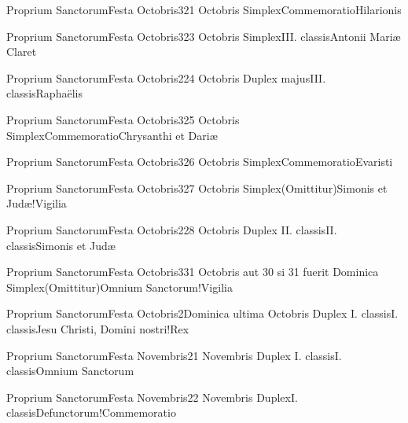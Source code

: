 \documentclass[psalterium-feriale.tex]{subfiles}
\begin{document}
	{Proprium Sanctorum}{Festa Octobris}{3}{21 Octobris}
	{Simplex}{Commemoratio}{Hilarionis}
	{}
	{}
\COPOaRubric

	{Proprium Sanctorum}{Festa Octobris}{3}{23 Octobris}
	{Simplex}{III. classis}{Antonii Mariæ Claret}
	{}
	{}
\COPOaRubric

	{Proprium Sanctorum}{Festa Octobris}{2}{24 Octobris}
	{Duplex majus}{III. classis}{Raphaëlis}
	{}
	{}
\psalmodiapropria

	{Proprium Sanctorum}{Festa Octobris}{3}{25 Octobris}
	{Simplex}{Commemoratio}{Chrysanthi et Dariæ}
	{}
	{}
\PMEXaRubric

	{Proprium Sanctorum}{Festa Octobris}{3}{26 Octobris}
	{Simplex}{Commemoratio}{Evaristi}
	{}
	{}
\UMEXaRubric

	{Proprium Sanctorum}{Festa Octobris}{3}{27 Octobris}
	{Simplex}{(Omittitur)}{Simonis et Judæ!Vigilia}
	{}
	{}
\feriaRubric

	{Proprium Sanctorum}{Festa Octobris}{2}{28 Octobris}
	{Duplex II. classis}{II. classis}{Simonis et Judæ}
	{}
	{}
\psalmodiapropria

	{Proprium Sanctorum}{Festa Octobris}{3}{31 Octobris aut 30 si 31 fuerit Dominica}
	{Simplex}{(Omittitur)}{Omnium Sanctorum!Vigilia}
	{}
	{}
\feriaRubric

	{Proprium Sanctorum}{Festa Octobris}{2}{Dominica ultima Octobris}
	{Duplex I. classis}{I. classis}{Jesu Christi, Domini nostri!Rex}
	{}
	{}
\psalmodiapropria

	{Proprium Sanctorum}{Festa Novembris}{2}{1 Novembris}
	{Duplex I. classis}{I. classis}{Omnium Sanctorum}
	{}
	{}
\psalmodiapropria
{}

	{Proprium Sanctorum}{Festa Novembris}{2}{2 Novembris}
	{Duplex}{I. classis}{Defunctorum!Commemoratio}
	{}
	{}
\psalmodiapropria
\end{document}
